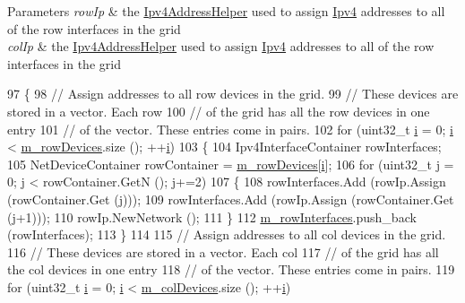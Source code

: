\begin{DoxyParams}{Parameters}
{\em row\+Ip} & the \hyperlink{classns3_1_1Ipv4AddressHelper}{Ipv4\+Address\+Helper} used to assign \hyperlink{classns3_1_1Ipv4}{Ipv4} addresses to all of the row interfaces in the grid\\
\hline
{\em col\+Ip} & the \hyperlink{classns3_1_1Ipv4AddressHelper}{Ipv4\+Address\+Helper} used to assign \hyperlink{classns3_1_1Ipv4}{Ipv4} addresses to all of the row interfaces in the grid \\
\hline
\end{DoxyParams}

\begin{DoxyCode}
97 \{
98   \textcolor{comment}{// Assign addresses to all row devices in the grid.}
99   \textcolor{comment}{// These devices are stored in a vector.  Each row }
100   \textcolor{comment}{// of the grid has all the row devices in one entry }
101   \textcolor{comment}{// of the vector.  These entries come in pairs.}
102   \textcolor{keywordflow}{for} (uint32\_t \hyperlink{bernuolliDistribution_8m_a6f6ccfcf58b31cb6412107d9d5281426}{i} = 0; \hyperlink{bernuolliDistribution_8m_a6f6ccfcf58b31cb6412107d9d5281426}{i} < \hyperlink{classns3_1_1PointToPointGridHelper_a78e6db5145507c7afec0022097c19e3a}{m\_rowDevices}.size (); ++\hyperlink{bernuolliDistribution_8m_a6f6ccfcf58b31cb6412107d9d5281426}{i})
103     \{
104       Ipv4InterfaceContainer rowInterfaces; 
105       NetDeviceContainer rowContainer = \hyperlink{classns3_1_1PointToPointGridHelper_a78e6db5145507c7afec0022097c19e3a}{m\_rowDevices}[\hyperlink{bernuolliDistribution_8m_a6f6ccfcf58b31cb6412107d9d5281426}{i}];
106       \textcolor{keywordflow}{for} (uint32\_t j = 0; j < rowContainer.GetN (); j+=2)
107         \{
108           rowInterfaces.Add (rowIp.Assign (rowContainer.Get (j))); 
109           rowInterfaces.Add (rowIp.Assign (rowContainer.Get (j+1)));
110           rowIp.NewNetwork ();
111         \}
112       \hyperlink{classns3_1_1PointToPointGridHelper_af0f8aef3297f634a1a66751a747d1777}{m\_rowInterfaces}.push\_back (rowInterfaces);
113     \}
114 
115   \textcolor{comment}{// Assign addresses to all col devices in the grid.}
116   \textcolor{comment}{// These devices are stored in a vector.  Each col }
117   \textcolor{comment}{// of the grid has all the col devices in one entry }
118   \textcolor{comment}{// of the vector.  These entries come in pairs.}
119   \textcolor{keywordflow}{for} (uint32\_t \hyperlink{bernuolliDistribution_8m_a6f6ccfcf58b31cb6412107d9d5281426}{i} = 0; \hyperlink{bernuolliDistribution_8m_a6f6ccfcf58b31cb6412107d9d5281426}{i} < \hyperlink{classns3_1_1PointToPointGridHelper_a7466f6cdc7e0c8b2461471a6f8921192}{m\_colDevices}.size (); ++\hyperlink{bernuolliDistribution_8m_a6f6ccfcf58b31cb6412107d9d5281426}{i})

\end{DoxyCode}
